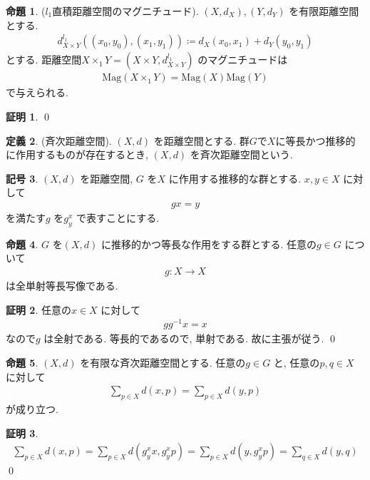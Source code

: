 \documentclass[10pt, fleqn, label-section=none]{bxjsarticle}
\theoremstyle{definition}
\newtheorem{dfn}{定義}[section]
\newtheorem{prop}[dfn]{命題}
\newtheorem{notation}[dfn]{記号}
\newtheorem*{pf*}{証明}
\renewcommand{\;}{\, ; \,}
\newcommand{\Mag}{\textrm{Mag}}
\begin{document}
\begin{prop}($l_1$直積距離空間のマグニチュード). $(X, d_X), (Y, d_Y)$ を有限距離空間とする. 
\begin{align*} d_{X\times Y}^{l_1} ((x_0, y_0), (x_1, y_1)) \coloneqq d_X (x_0, x_1) + d_Y (y_0, y_1)\end{align*}
とする. 距離空間$X \times_1 Y = (X \times Y, d_{X\times Y}^{l_1} ) $ のマグニチュードは
\begin{align*} \Mag(X \times _1 Y ) = \Mag(X) \Mag(Y) \end{align*}
で与えられる.
\end{prop}
\begin{pf*}

\qed
\end{pf*}




\begin{dfn}(斉次距離空間). 
$(X, d)$ を距離空間とする. 群$G$で$X$に等長かつ推移的に作用するものが存在するとき, $(X, d)$ を斉次距離空間という. 

\end{dfn}




\begin{notation}$(X, d)$ を距離空間, $G$ を$X$ に作用する推移的な群とする. $x, y \in X$ に対して 
\begin{align*} g x = y \end{align*}
を満たす$g$ を$g^{x}_y$ で表すことにする.
\end{notation}




\begin{prop}$G$ を$(X, d)$ に推移的かつ等長な作用をする群とする. 任意の$g \in G$ について
\begin{align*} g: X \rightarrow X\end{align*}
は全単射等長写像である.
\end{prop}
\begin{pf*}任意の$x \in X$ に対して
\begin{align*} g g^{-1}x = x\end{align*}
なので$g$ は全射である. 等長的であるので, 単射である. 故に主張が従う.
\qed
\end{pf*}




\begin{prop}$(X, d)$ を有限な斉次距離空間とする. 任意の$g \in G$ と, 任意の$p, q \in X$ に対して 
\begin{align*}  \sum_{p \in X} d(x, p) = \sum_{p \in X} d(y, p) \end{align*}
が成り立つ.
\end{prop}
\begin{pf*} 
\begin{align*} \sum_{p \in X} d(x, p) = \sum_{p \in X} d(g^x_y x, g^x_y p) = \sum_{p \in X} d(y, g^x_y p) = \sum_{q \in X} d(y, q)  \end{align*}
\qed
\end{pf*}
\end{document}
